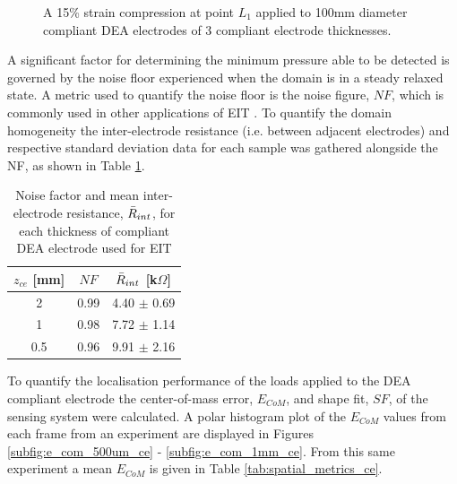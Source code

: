 \begin{figure}[H]
	\vspace{0.1cm}
	\caption{A 15\% strain compression at point $L_1$ applied to 100mm diameter compliant DEA electrodes of 3 compliant electrode thicknesses.}
	\label{fig:EIT_thickness_compare}
\end{figure}
A significant factor for determining the minimum pressure able to be detected is governed by the noise floor experienced when the domain is in a steady relaxed state. A metric used to quantify the noise floor is the noise figure, $N\!F$, which is commonly used in other applications of EIT\cite{Adler2009, Ellingham2024} . To quantify the domain homogeneity the inter-electrode resistance (i.e. between adjacent electrodes) and respective standard deviation data for each sample was gathered alongside the NF, as shown in Table \ref{tab:NF_vals}.
\begin{table}[H]
	\centering
	\caption{Noise factor and mean inter-electrode resistance, $\Bar{R}_{int}$, for each thickness of compliant DEA electrode used for EIT}
	\label{tab:NF_vals}
	\begin{tabular}{c|c|c}
		$z_{ce}$ [mm] & $N\!F$ & $\Bar{R}_{int}$ [k$\Omega$]\\
		\hline
		2 & 0.99 & 4.40 $\pm$ 0.69 \\
		1 & 0.98 & 7.72 $\pm$ 1.14\\
		0.5 & 0.96 & 9.91 $\pm$ 2.16\\
	\end{tabular}
\end{table}
To quantify the localisation performance of the loads applied to the DEA compliant electrode the center-of-mass error, $E_{CoM}$, and shape fit, $S\!F$, of the sensing system were calculated.	A polar histogram plot of the $E_{CoM}$ values from each frame from an experiment are displayed in Figures \ref{subfig:e_com_500um_ce} - \ref{subfig:e_com_1mm_ce}. From this same experiment a mean $E_{CoM}$ is given in Table \ref{tab:spatial_metrics_ce}.

